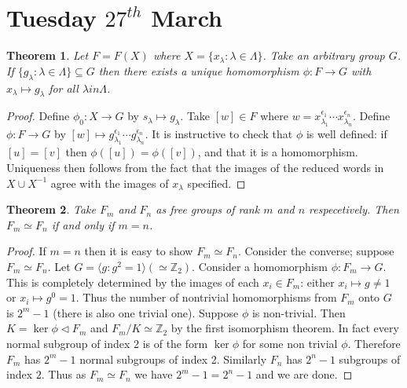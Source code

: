 \documentclass[a4paper,10pt]{article}
\newcommand{\ZZ}{\mathbb{Z}}
\newtheorem{thm}{Theorem}
\begin{document}
\newpage
\section{Tuesday $27^{th}$ March}

\begin{thm}
Let $F = F(X)$ where $X = \{ x_\lambda : \lambda \in \Lambda \}$. Take an arbitrary group $G$. If $\{ g_\lambda : \lambda \in \Lambda \} \subseteq G$ then there exists a unique homomorphism $\phi : F \rightarrow G$ with $x_\lambda \mapsto g_\lambda$ for all $\lambda in \Lambda$. 
\end{thm}

\begin{proof}
Define $\phi_0 : X \rightarrow G$ by $s_\lambda \mapsto g_\lambda$. Take $[w] \in F$ where $w = x^{\epsilon_1}_{\lambda_1} \cdots x^{\epsilon_n}_{\lambda_n}$. Define $\phi : F \rightarrow G$ by $[w] \mapsto g^{\epsilon_1}_{\lambda_1} \cdots g^{\epsilon_n}_{\lambda_n}$. It is instructive to check that $\phi$ is well defined: if $[u] = [v]$ then $\phi([u]) = \phi([v])$, and that it is a homomorphism. Uniqueness then follows from the fact that the images of the reduced words in $X \cup X^{-1}$ agree with the images of $x_\lambda$ specified. 
\end{proof}

\begin{thm}
Take $F_m$ and $F_n$ as free groups of rank $m$ and $n$ respecetively. Then $F_m \simeq F_n$ if and only if $m = n$. 
\end{thm}

\begin{proof}
If $m = n$ then it is easy to show $F_m \simeq F_n$. Consider the converse; suppose $F_m \simeq F_n$. Let $G = \langle g : g^2 = 1 \rangle (\simeq \ZZ_2)$. Consider a homomorphism $\phi : F_m \rightarrow G$. This is completely determined by the images of each $x_i \in F_m$: either $x_i \mapsto g \neq 1$ or $x_i \mapsto g^0 = 1$. Thus the number of nontrivial homomorphisms from $F_m$ onto $G$ is $2^m - 1$ (there is also one trivial one). Suppose $\phi$ is non-trivial. Then $K = \ker \phi \triangleleft F_m$ and $F_m / K \simeq \ZZ_2$ by the first isomorphism theorem. In fact every normal subgroup of index 2 is of the form $\ker \phi$ for some non trivial $\phi$. Therefore $F_m$ has $2^m - 1$ normal subgroups of index 2. Similarly $F_n$ has $2^n - 1$ subgroups of index $2$. Thus as $F_m \simeq F_n$ we have $2^m - 1 = 2^n - 1$ and we are done.
\end{proof}
\end{document}
